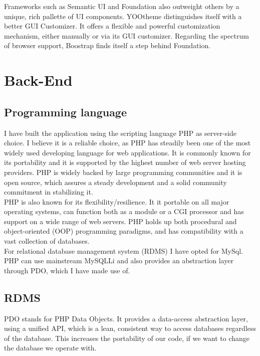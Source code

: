 Frameworks such as Semantic UI and Foundation also outweight others by a unique, rich pallette of UI components.
YOOtheme distinguishes itself with a better GUI Customizer. It offers a flexible and powerful customization mechanism, either manually or via its GUI customizer.
Regarding the spectrum of browser support, Boostrap finds itself a step behind Foundation.\\


\section{Back-End}

\subsection{Programming language} 

I have built the application using the scripting language PHP as server-side choice. I believe it is a reliable choice, as PHP has steadily been one of the most widely used developing language for web applications. It is commonly known for its portability and it is supported by the highest number of web server hosting providers. 
PHP is widely backed by large programming communities and it is open source, which assures a steady development and a solid community commitment in stabilizing it.\\ 

PHP is also known for its flexibility/resilience. It it portable on all major operating systems, can function both as a module or a CGI processor and has support on a wide range of web servers. PHP  holds up both procedural and object-oriented (OOP) programming paradigms, and has compatibility with a vast collection of databases.\\ 

For relational database management system (RDMS) I have opted for MySql. PHP can use mainstream MySQLLi and also provides an abstraction layer through PDO, which I have made use of.

\subsection{RDMS} 

PDO stands for PHP Data Objects. It provides a data-access abstraction layer, using a unified API, which is a lean, consistent way to access databases regardless of the database. This increases the portability of our code, if we want to change the database we operate with.\\

